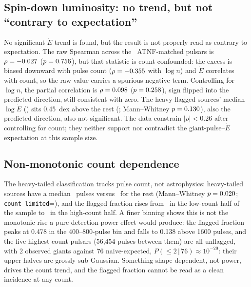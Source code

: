 \documentclass[twocolumn]{aastex631}
\newcommand{\code}[1]{\texttt{#1}}
\begin{document}
\subsection{Spin-down luminosity: no trend, but not ``contrary to expectation''}
No significant $\dot E$ trend is found, but the result is not properly read as contrary to
expectation. The raw Spearman
across the \ptRealNMatched\ ATNF-matched pulsars is $\rho=-0.027$
($p=0.756$), but that statistic is count-confounded: the excess is biased downward
with pulse count ($\rho=-0.355$ with $\log n$) and $\dot E$ correlates with count, so
the raw value carries a spurious negative term. Controlling for $\log n$, the partial
correlation is $\rho=0.098$ ($p=0.258$), sign flipped into the
predicted direction, still consistent with zero. The heavy-flagged sources' median
$\log\dot E$ (\ptRealLogEdotHeavy) sits 0.45~dex above the rest (\ptRealLogEdotNon;
Mann--Whitney $p=0.130$), also the predicted direction, also not significant.
The data constrain $|\rho| < 0.26$ after controlling for count; they neither support nor
contradict the giant-pulse--$\dot E$ expectation at this sample size.

\subsection{Non-monotonic count dependence}
The heavy-tailed classification tracks pulse
count, not astrophysics: heavy-tailed sources have a median \ptRealMedNHeavy\ pulses versus \ptRealMedNNon\ for
the rest (Mann--Whitney $p=0.020$; \code{count\_limited}=\ptRealCountLimited), and the
flagged fraction rises from \ptRealHeavyFracLow\ in the low-count half of the sample to
\ptRealHeavyFracHigh\ in the high-count half. A finer binning shows this is not the
monotonic rise a pure detection-power effect would produce: the flagged fraction peaks at
0.478 in the 400--800-pulse bin and falls to 0.138 above 1600 pulses, and the five
highest-count pulsars (56,454 pulses between them) are all unflagged, with 2 observed giants
against 76 naive-expected, $P(\le 2 \,|\, 76) \approx 10^{-29}$: their upper halves are
grossly sub-Gaussian. Something shape-dependent, not power, drives the count trend,
and the flagged fraction cannot be read as a clean incidence at any count.
\end{document}
